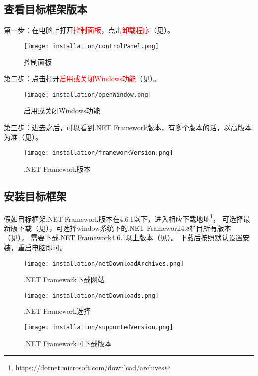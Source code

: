 \subsection{查看目标框架版本}
\par 第一步：在电脑上打开\textcolor{red}{控制面板}，点击\textcolor{red}{卸载程序}（见）。
\begin{figure}[H]
    \centering
    \texttt{[image: installation/controlPanel.png]}
    \caption{ 控制面板 \label{fig:controlPanel}}
\end{figure}
\par 第二步：点击打开\textcolor{red}{启用或关闭Windows功能}（见）。
\begin{figure}[H]
    \centering
    \texttt{[image: installation/openWindow.png]}
    \caption{ 启用或关闭Windows功能 \label{fig:openWindow}}
\end{figure}
\par 第三步：进去之后，可以看到.NET Framework版本，有多个版本的话，以高版本为准（见）。
\begin{figure}[H]
    \centering
    \texttt{[image: installation/frameworkVersion.png]}
    \caption{ .NET Framework版本 \label{fig:frameworkVersion}}
\end{figure}

\subsection{安装目标框架}
假如目标框架.NET Framework版本在4.6.1以下，进入相应下载地址\footnote{https://dotnet.microsoft.com/download/archives}，
可选择最新版下载（见），可选择window系统下的.NET Framework4.8栏目所有版本（见），
需要下载.NET Framework4.6.1以上版本（见）。
下载后按照默认设置安装，重启电脑即可。
\begin{figure}[H]
    \centering
    \texttt{[image: installation/netDownloadArchives.png]}
    \caption{ .NET Framework下载网站 \label{fig:netDownloadArchives}}
\end{figure}
\begin{figure}[H]
    \centering
    \texttt{[image: installation/netDownloads.png]}
    \caption{ .NET Framework选择 \label{fig:netDownloads}}
\end{figure}
\begin{figure}[H]
    \centering
    \texttt{[image: installation/supportedVersion.png]}
    \caption{ .NET Framework可下载版本 \label{fig:supportedVersion}}
\end{figure}

